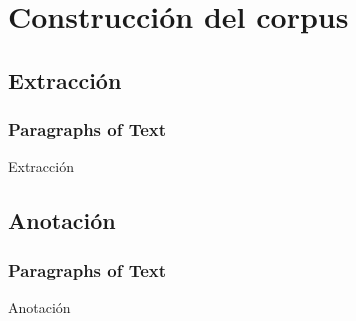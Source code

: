 \section{Construcción del corpus}

\subsection{Extracción}
\begin{frame}
    \frametitle{Paragraphs of Text}
    Extracción
\end{frame}

\subsection{Anotación}
\begin{frame}
    \frametitle{Paragraphs of Text}
    Anotación
\end{frame}
